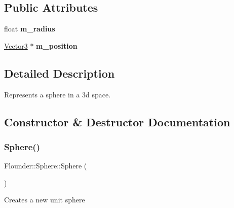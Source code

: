 \subsection*{Public Attributes}
\begin{DoxyCompactItemize}
\item 
\mbox{\label{class_flounder_1_1_sphere_a94219572f989e7730334273c950d5a7b}} 
float {\bfseries m\+\_\+radius}
\item 
\mbox{\label{class_flounder_1_1_sphere_a9459b55c4192e9b1bec3a4b9609f2cbb}} 
\hyperlink{class_flounder_1_1_vector3}{Vector3} $\ast$ {\bfseries m\+\_\+position}
\end{DoxyCompactItemize}


\subsection{Detailed Description}
Represents a sphere in a 3d space. 



\subsection{Constructor \& Destructor Documentation}
\mbox{\label{class_flounder_1_1_sphere_a194a9159be0f16401651ca5e616e47cf}} 
\subsubsection{\texorpdfstring{Sphere()}{Sphere()}\hspace{0.1cm}{\footnotesize\ttfamily [1/3]}}
{\footnotesize\ttfamily Flounder\+::\+Sphere\+::\+Sphere (\begin{DoxyParamCaption}{ }\end{DoxyParamCaption})}



Creates a new unit sphere 

\mbox{\label{class_flounder_1_1_sphere_acfa33a8e19ff9d2b7e818568be514dc8}} 
